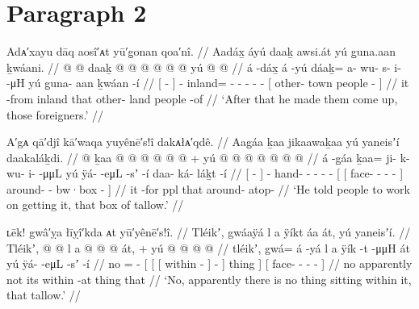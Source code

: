 \clearpage
\section{Paragraph 2}\label{sec:92-para-2}

\ex\label{ex:92-13-made-foreigners-come-up}%
%
\begingl
	\glpreamble	Adᴀ′xayu dāq aosî′ᴀt yū′g̣onan qoa′nî. //
	\glpreamble	Aadáx̱ áyú daaḵ awsi.át yú g̱una.aan ḵwáani. //
	\gla	{}  @ {} {}  @ {}
		daaḵ @  @ {} @ {} @ {} @ {} @ {}
		{} yú  @ {}  @ {} {} //
	\glb	{} á -dáx̱ {} á -yú
		dáaḵ= a- wu- s- i-  -μH
		{} yú g̱una- aan ḵwáan -í {} //
	\glc	{}[  - {}]  -
		inland= - - - -  -
		{}[  other- town people - {}] //
	\gld	{} it -from {}  {}
		inland  {} {} {} {} {}
		{} that other- land people -of {} //
	\glft	‘After that he made them come up, those foreigners.’
		//
\endgl
\xe

\ex\label{ex:92-14-tell-to-work-on-box-of-grease}%
%
\begingl
	\glpreamble	A′gᴀ qā′djî kā′waqa yuyênē′s!î dakᴀłᴀ′qdê. //
	\glpreamble	Aag̱áa ḵaa jikaawaḵaa yú yaneisʼí daakaláḵdi. //
	\gla	{}  @ {} {}
		ḵaa @  @ {} @ {} @ {} @ {} @ {} +
		{} yú {}  @ {} @ {} @ {} @ {} {}
			 @ {} @ {} @ {} {} //
	\glb	{} á -g̱áa {}
		ḵaa= ji- k- wu- i-  -μμL
		{} yú {} ÿá-  -eμL -sʼ -í {}
			daa- ká- láḵt -í {} //
	\glc	{}[  - {}]
		- hand- - - -  -
		{}[  [ face- 
				- - - {}]
			around- - bw·box - {}] //
	\gld	{} it -for {}
		ppl  {} {} {} {} {}
		{} that {}  {} {} {} {} {}
			around- atop-  {} {} //
	\glft	‘He told people to work on getting it, that box of tallow.’
		//
\endgl
\xe

\ex\label{ex:92-15-nothing-inside-it}%
%
\begingl
	\glpreamble	ʟēk! gwâ′ỵa łīỵî′kda ᴀt yū′yênē′s!î. //
	\glpreamble	Tléikʼ, gwáaÿá l a ÿíkt áa át, yú yaneisʼí. //
	\gla	Tléikʼ,  @ {} @ {}
		{} l {} {} a  @ {} {}  @ {} @ {} {} át, {} +
		{} yú  @ {} @ {} @ {} @ {} {} //
	\glb	tléikʼ, gwá= á -yá
		{} l {} {} a ÿík -t {}  -μμH {} {} át {}
		{} yú ÿá-  -eμL -sʼ -í {} //
	\glc	no =  -
		{}[  {}[ {}[  within - {}]
			 - \· {}] thing {}]
		{}[  face- 
				- - - {}] //
	\gld	no apparently\·  {}
		{} not {} {} its within -at {}
			 {} {} {} thing {}
		{} that  {} {} {} {} {} //
	\glft	‘No, apparently there is no thing sitting within it, that tallow.’
		//
\endgl
\xe

